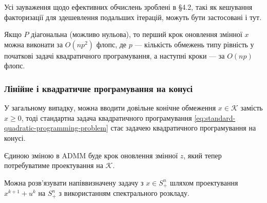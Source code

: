 \begin{remark}
    Усі зауваження щодо ефективних обчислень зроблені в \S4.2, такі як кешування факторизації для здешевлення подальших ітерацій, можуть бути застосовані і тут. 
\end{remark}

\begin{example}
	Якщо $P$ діагональна (можливо нульова), то перший крок оновлення змінної $x$ можна виконати за $O(np^2)$ флопс, де $p$ --- кількість обмежень типу рівність у початкові задачі квадратичного програмування, а наступні кроки --- за $O(np)$ флопс.
\end{example}

\subsubsection{Лінійне і квадратичне програмування на конусі}

У загальному випадку, можна вводити довільне конічне обмеження $x \in \mathcal{K}$ замість $x \ge 0$, тоді стандартна задача квадратичного програмування \eqref{eq:standard-quadratic-programming-problem} стає задачею квадратичного програмування на конусі. \medskip

Єдиною зміною в ADMM буде крок оновлення змінної $z$, який тепер потребуватиме проектування на $\mathcal{K}$. 

\begin{example}
	Можна розв'язувати напіввизначену задачу з $x \in S_+^n$ шляхом проектування $x^{k + 1} + u^k$ на $S_+^n$ з використанням спектрального розкладу.
\end{example}
